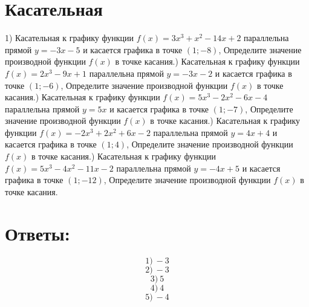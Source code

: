 \documentclass[fleqn]{article}
\begin{document}
\begin{large}
    \section*{Касательная}
1) Касательная к графику функции $f(x)=3x^3+x^2-14x+2$ параллельна прямой $y=-3x-5$ и касается графика в точке $(1; -8)$,\newline
Определите значение производной функции $f(x)$ в точке касания.\newline{}) Касательная к графику функции $f(x)=2x^3-9x+1$ параллельна прямой $y=-3x-2$ и касается графика в точке $(1; -6)$,\newline
Определите значение производной функции $f(x)$ в точке касания.\newline{}) Касательная к графику функции $f(x)=5x^3-2x^2-6x-4$ параллельна прямой $y=5x$ и касается графика в точке $(1; -7)$,\newline
Определите значение производной функции $f(x)$ в точке касания.\newline{}) Касательная к графику функции $f(x)=-2x^3+2x^2+6x-2$ параллельна прямой $y=4x+4$ и касается графика в точке $(1; 4)$,\newline
Определите значение производной функции $f(x)$ в точке касания.\newline{}) Касательная к графику функции $f(x)=5x^3-4x^2-11x-2$ параллельна прямой $y=-4x+5$ и касается графика в точке $(1; -12)$,\newline
Определите значение производной функции $f(x)$ в точке касания.\newline\newline
    \section*{Ответы: }
\[1)\: -3\]
\[2)\: -3\]
\[3)\: 5\]
\[4)\: 4\]
\[5)\: -4\]
\end{large}
\end{document}
